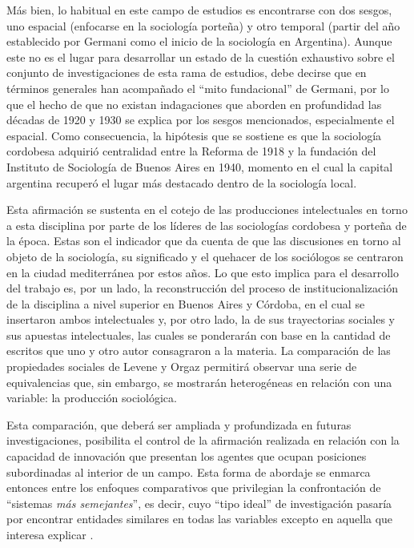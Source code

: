 Más bien, lo habitual en este campo de estudios es encontrarse con dos sesgos, uno espacial (enfocarse en la sociología porteña) y otro temporal (partir del año establecido por Germani como el inicio de la sociología en Argentina). Aunque este no es el lugar para desarrollar un estado de la cuestión exhaustivo sobre el conjunto de investigaciones de esta rama de estudios, debe decirse que en términos generales han acompañado el \enquote{mito fundacional} de Germani, por lo que el hecho de que no existan indagaciones que aborden en profundidad las décadas de 1920 y 1930 se explica por los sesgos mencionados, especialmente el espacial. Como consecuencia, la hipótesis que se sostiene es que la sociología cordobesa adquirió centralidad entre la Reforma de 1918 y la fundación del Instituto de Sociología de Buenos Aires en 1940, momento en el cual la capital argentina recuperó el lugar más destacado dentro de la sociología local.

Esta afirmación se sustenta en el cotejo de las producciones intelectuales en torno a esta disciplina por parte de los líderes de las sociologías cordobesa y porteña de la época. Estas son el indicador que da cuenta de que las discusiones en torno al objeto de la sociología, su significado y el quehacer de los sociólogos se centraron en la ciudad mediterránea por estos años. Lo que esto implica para el desarrollo del trabajo es, por un lado, la reconstrucción del proceso de institucionalización de la disciplina a nivel superior en Buenos Aires y Córdoba, en el cual se insertaron ambos intelectuales y, por otro lado, la de sus trayectorias sociales y sus apuestas intelectuales, las cuales se ponderarán con base en la cantidad de escritos que uno y otro autor consagraron a la materia. La comparación de las propiedades sociales de Levene y Orgaz permitirá observar una serie de equivalencias que, sin embargo, se mostrarán heterogéneas en relación con una variable: la producción sociológica.

Esta comparación, que deberá ser ampliada y profundizada en futuras investigaciones, posibilita el control de la afirmación realizada en relación con la capacidad de innovación que presentan los agentes que ocupan posiciones subordinadas al interior de un campo. Esta forma de abordaje se enmarca entonces entre los enfoques comparativos que privilegian la confrontación de \enquote{sistemas \emph{más semejantes}}, es decir, cuyo \enquote{tipo ideal} de investigación pasaría por encontrar entidades similares en todas las variables excepto en aquella que interesa explicar \parencite[29-49]{1509-SARTORI1994}.

